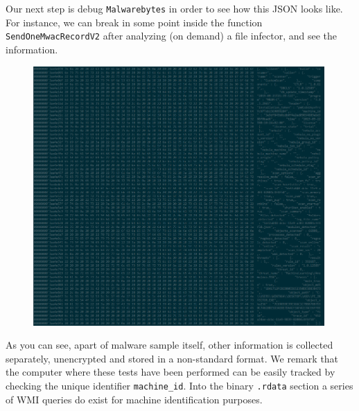 Our next step is debug \texttt{Malwarebytes} in order to see how this JSON
looks like. For instance, we can break in some point inside the function
\texttt{SendOneMwacRecordV2} after analyzing (on demand) a file infector, and
see the information.
\begin{figure}[h]
  \centering
  \includegraphics[width=0.99\textwidth]{./figures/Debug1}
\end{figure}
As you can see, apart of malware sample itself, other information is collected
separately, unencrypted and stored in a non-standard format. We remark that
the computer where these tests have been performed can be easily tracked by
checking the unique identifier \texttt{machine\_id}. Into the binary
\texttt{.rdata} section a series of WMI queries do exist for machine
identification purposes.
